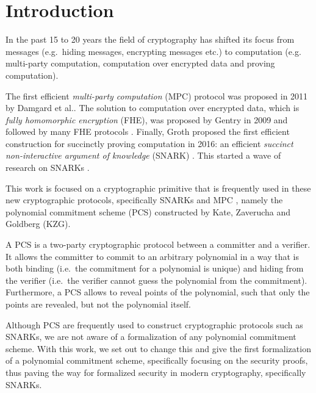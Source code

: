 
\chapter{Introduction}\label{chapter:introduction}
In the past 15 to 20 years the field of cryptography has shifted its focus from messages (e.g.\ hiding messages, encrypting messages etc.) to computation (e.g. multi-party computation, computation over encrypted data and proving computation).

The first efficient \textit{multi-party computation} (MPC) protocol was proposed in 2011 by Damgard et al.\parencite{SPDZ}. The solution to computation over encrypted data, which is \textit{fully homomorphic encryption} (FHE), was proposed by Gentry in 2009 \parencite{fhe} and followed by many FHE protocols \parencite{CKKS,TFHE,BGV,BFV}.
Finally, Groth proposed the first efficient construction for succinctly proving computation in 2016: an efficient \textit{succinct non-interactive argument of knowledge} (SNARK) \parencite{Groth16}. This started a wave of research on SNARKs \parencite{thalerbook,Groth16,Bulletproofs,marlin,sonic,plonk,halo,nova,ProtoStar}.

This work is focused on a cryptographic primitive that is frequently used in these new cryptographic protocols, specifically SNARKs\parencite{plonk,sonic,marlin,halo} and MPC \parencite{PCS_MPC,BDOZ, VSS_MPC, KZG}, namely the polynomial commitment scheme (PCS) constructed by Kate, Zaverucha and Goldberg (KZG)\parencite{KZG}.

A PCS is a two-party cryptographic protocol between a committer and a verifier. It allows the committer to commit to an arbitrary polynomial in a way that is both binding (i.e.\ the commitment for a polynomial is unique) and hiding from the verifier (i.e.\ the verifier cannot guess the polynomial from the commitment). Furthermore, a PCS allows to reveal points of the polynomial, such that only the points are revealed, but not the polynomial itself. 

Although PCS are frequently used to construct cryptographic protocols such as SNARKs, we are not aware of a formalization of any polynomial commitment scheme. With this work, we set out to change this and give the first formalization of a polynomial commitment scheme, specifically focusing on the security proofs, thus paving the way for formalized security in modern cryptography, specifically SNARKs.

